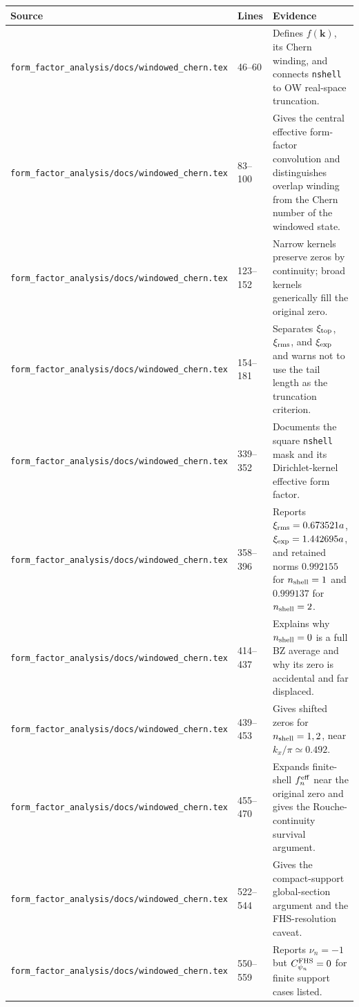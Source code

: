 \documentclass[aps,prb,onecolumn,nofootinbib,superscriptaddress]{revtex4-2}
\begin{document}
\begin{table}[h]
\small
\begin{tabular}{p{}p{}p{}}
\toprule
Source & Lines & Evidence \\
\midrule
\texttt{form\_factor\_analysis/docs/windowed\_chern.tex} & 46--60 & Defines $f(\bm{k})$, its Chern winding, and connects \texttt{nshell} to OW real-space truncation. \\
\texttt{form\_factor\_analysis/docs/windowed\_chern.tex} & 83--100 & Gives the central effective form-factor convolution and distinguishes overlap winding from the Chern number of the windowed state. \\
\texttt{form\_factor\_analysis/docs/windowed\_chern.tex} & 123--152 & Narrow kernels preserve zeros by continuity; broad kernels generically fill the original zero. \\
\texttt{form\_factor\_analysis/docs/windowed\_chern.tex} & 154--181 & Separates $\xi_{\rm top}$, $\xi_{\rm rms}$, and $\xi_{\rm exp}$ and warns not to use the tail length as the truncation criterion. \\
\texttt{form\_factor\_analysis/docs/windowed\_chern.tex} & 339--352 & Documents the square \texttt{nshell} mask and its Dirichlet-kernel effective form factor. \\
\texttt{form\_factor\_analysis/docs/windowed\_chern.tex} & 358--396 & Reports $\xi_{\rm rms}=0.673521a$, $\xi_{\rm exp}=1.442695a$, and retained norms $0.992155$ for $n_{\rm shell}=1$ and $0.999137$ for $n_{\rm shell}=2$. \\
\texttt{form\_factor\_analysis/docs/windowed\_chern.tex} & 414--437 & Explains why $n_{\rm shell}=0$ is a full BZ average and why its zero is accidental and far displaced. \\
\texttt{form\_factor\_analysis/docs/windowed\_chern.tex} & 439--453 & Gives shifted zeros for $n_{\rm shell}=1,2$, near $k_x/\pi\simeq0.492$. \\
\texttt{form\_factor\_analysis/docs/windowed\_chern.tex} & 455--470 & Expands finite-shell $f_n^{\rm eff}$ near the original zero and gives the Rouche-continuity survival argument. \\
\texttt{form\_factor\_analysis/docs/windowed\_chern.tex} & 522--544 & Gives the compact-support global-section argument and the FHS-resolution caveat. \\
\texttt{form\_factor\_analysis/docs/windowed\_chern.tex} & 550--559 & Reports $\nu_n=-1$ but $C_{\psi_n}^{\rm FHS}=0$ for finite support cases listed. \\

\end{tabular}
\end{table}
\end{document}
